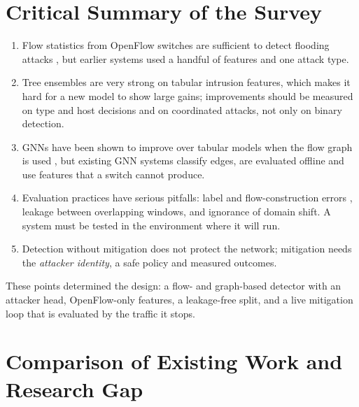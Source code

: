 \section{Critical Summary of the Survey}
\begin{enumerate}
	\item Flow statistics from OpenFlow switches are sufficient to detect flooding attacks \cite{bib:braga}, but earlier systems used a handful of features and one attack type.
	\item Tree ensembles are very strong on tabular intrusion features, which makes it hard for a new model to show large gains; improvements should be measured on type and host decisions and on coordinated attacks, not only on binary detection.
	\item GNNs have been shown to improve over tabular models when the flow graph is used \cite{bib:egraphsage}, but existing GNN systems classify edges, are evaluated offline and use features that a switch cannot produce.
	\item Evaluation practices have serious pitfalls: label and flow-construction errors \cite{bib:engelen}, leakage between overlapping windows, and ignorance of domain shift. A system must be tested in the environment where it will run.
	\item Detection without mitigation does not protect the network; mitigation needs the \emph{attacker identity}, a safe policy and measured outcomes.
\end{enumerate}
These points determined the design: a flow- and graph-based detector with an attacker head, OpenFlow-only features, a leakage-free split, and a live mitigation loop that is evaluated by the traffic it stops.

\section{Comparison of Existing Work and Research Gap}

